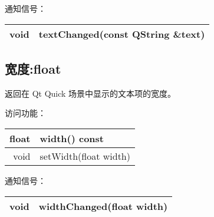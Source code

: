 通知信号：


\begin{tabular}{|r|l|}
	\hline
	void &	textChanged(const QString \&text) \\
	\hline
	\end{tabular}

\subsection{宽度:float} 

返回在 Qt Quick 场景中显示的文本项的宽度。

访问功能：

\begin{tabular}{|r|l|}
	\hline
	float &	width() const \\ 
	\hline
	void &	setWidth(float width) \\
	\hline
	\end{tabular}

通知信号：

\begin{tabular}{|r|l|}
	\hline
	void&	widthChanged(float width)\\
	\hline
	\end{tabular}



